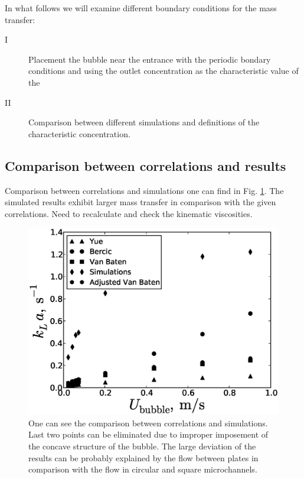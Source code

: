 \documentclass{article}
\begin{document}
In what follows we will examine different boundary conditions for the mass transfer:
\begin{description}
 \item[I] Placement the bubble near the entrance with the periodic bondary conditions and using the
outlet concentration as the characteristic value of the 
\item[II] 
\end{description}

\begin{figure}[htb!]
\caption{Comparison between different simulations and definitions of the characteristic
concentration.}
\end{figure}


\subsection{Comparison between correlations and results}
Comparison between correlations and simulations one can find in Fig.
\ref{fig:comparison:correlations}. The simulated results exhibit larger mass transfer in comparison
with the given correlations. {\color{red} Need to recalculate and check the kinematic viscosities.}
\begin{figure}[htb!]
\includegraphics[width=\textwidth]{Figures/comparison_correlations.eps}
\caption{One can see the comparison between correlations and simulations. {\color{red} Last two
points can be eliminated due to improper imposement of the concave structure of the bubble. The
large deviation of the results can be probably explained by the flow between plates in comparison
with the flow in circular and square microchannels.} \label{fig:comparison:correlations}}
\end{figure}
\end{document}
